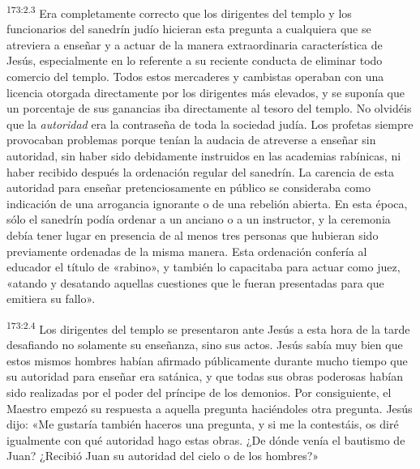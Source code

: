\par 
\textsuperscript{173:2.3} Era completamente correcto que los dirigentes del templo y los funcionarios del sanedrín judío hicieran esta pregunta a cualquiera que se atreviera a enseñar y a actuar de la manera extraordinaria característica de Jesús, especialmente en lo referente a su reciente conducta de eliminar todo comercio del templo. Todos estos mercaderes y cambistas operaban con una licencia otorgada directamente por los dirigentes más elevados, y se suponía que un porcentaje de sus ganancias iba directamente al tesoro del templo. No olvidéis que la \textit{autoridad} era la contraseña de toda la sociedad judía. Los profetas siempre provocaban problemas porque tenían la audacia de atreverse a enseñar sin autoridad, sin haber sido debidamente instruidos en las academias rabínicas, ni haber recibido después la ordenación regular del sanedrín. La carencia de esta autoridad para enseñar pretenciosamente en público se consideraba como indicación de una arrogancia ignorante o de una rebelión abierta. En esta época, sólo el sanedrín podía ordenar a un anciano o a un instructor, y la ceremonia debía tener lugar en presencia de al menos tres personas que hubieran sido previamente ordenadas de la misma manera. Esta ordenación confería al educador el título de «rabino», y también lo capacitaba para actuar como juez, «atando y desatando aquellas cuestiones que le fueran presentadas para que emitiera su fallo».

\par 
\textsuperscript{173:2.4} Los dirigentes del templo se presentaron ante Jesús a esta hora de la tarde desafiando no solamente su enseñanza, sino sus actos. Jesús sabía muy bien que estos mismos hombres habían afirmado públicamente durante mucho tiempo que su autoridad para enseñar era satánica, y que todas sus obras poderosas habían sido realizadas por el poder del príncipe de los demonios. Por consiguiente, el Maestro empezó su respuesta a aquella pregunta haciéndoles otra pregunta. Jesús dijo: «Me gustaría también haceros una pregunta, y si me la contestáis, os diré igualmente con qué autoridad hago estas obras. ¿De dónde venía el bautismo de Juan? ¿Recibió Juan su autoridad del cielo o de los hombres?»

